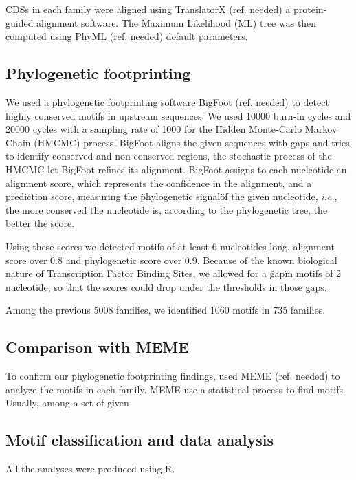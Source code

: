 CDSs in each family were aligned using TranslatorX (ref. needed) a protein-guided alignment software. The Maximum Likelihood (ML) tree was then computed using PhyML (ref. needed) default parameters.

\subsection*{Phylogenetic footprinting}

We used a phylogenetic footprinting software BigFoot (ref. needed) to detect highly conserved motifs in upstream sequences. We used 10000 burn-in cycles and 20000 cycles with a sampling rate of 1000 for the Hidden Monte-Carlo Markov Chain (HMCMC) process. BigFoot aligns the given sequences with gaps and tries to identify conserved and non-conserved regions, the stochastic process of the HMCMC let BigFoot refines its alignment. BigFoot assigns to each nucleotide an alignment score, which represents the confidence in the alignment, and a prediction score, measuring the \"phylogenetic signal\" of the given nucleotide, \textit{i.e.}, the more conserved the nucleotide is, according to the phylogenetic tree, the better the score.

Using these scores we detected motifs of at least 6 nucleotides long, alignment score over 0.8 and phylogenetic score over 0.9. Because of the known biological nature of Transcription Factor Binding Sites, we allowed for a \"gap\" in motifs of 2 nucleotide, so that the scores could drop under the thresholds in those gaps.

Among the previous 5008 families, we identified 1060 motifs in 735 families.

\subsection*{Comparison with MEME}

To confirm our phylogenetic footprinting findings, used MEME (ref. needed) to analyze the motifs in each family. MEME use a statistical process to find motifs. Usually, among a set of given

\subsection*{Motif classification and data analysis}

All the analyses were produced using R.

